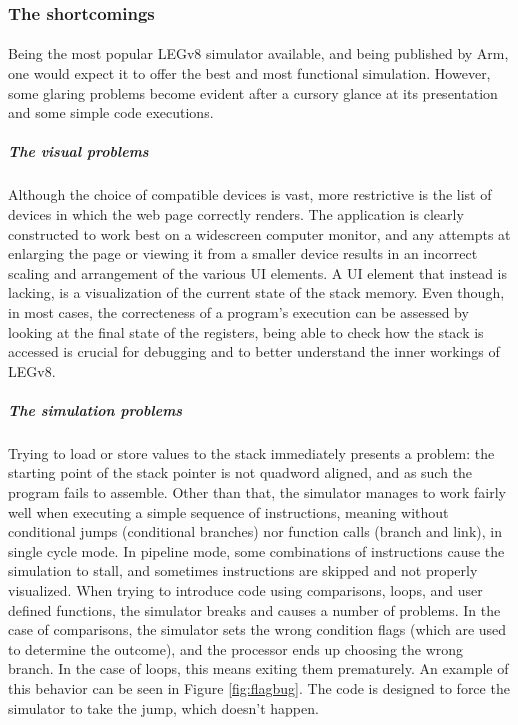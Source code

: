 \subsubsection{The shortcomings}
\paragraph{}
Being the most popular LEGv8 simulator available, and being published by Arm, one would expect it to offer the best and most functional simulation. However, some glaring problems become evident after a cursory glance at its presentation and some simple code executions.
\subparagraph{The visual problems}
Although the choice of compatible devices is vast, more restrictive is the list of devices in which the web page correctly renders. The application is clearly constructed to work best on a widescreen computer monitor, and any attempts at enlarging the page or viewing it from a smaller device results in an incorrect scaling and arrangement of the various UI elements. A UI element that instead is lacking, is a visualization of the current state of the stack memory. Even though, in most cases, the correcteness of a program's execution can be assessed by looking at the final state of the registers, being able to check how the stack is accessed is crucial for debugging and to better understand the inner workings of LEGv8.
\subparagraph{The simulation problems}
Trying to load or store values to the stack immediately presents a problem: the starting point of the stack pointer is not quadword aligned, and as such the program fails to assemble. Other than that, the simulator manages to work fairly well when executing a simple sequence of instructions, meaning without conditional jumps (conditional branches) nor function calls (branch and link), in single cycle mode. In pipeline mode, some combinations of instructions cause the simulation to stall, and sometimes instructions are skipped and not properly visualized. When trying to introduce code using comparisons, loops, and user defined functions, the simulator breaks and causes a number of problems. In the case of comparisons, the simulator sets the wrong condition flags (which are used to determine the outcome), and the processor ends up choosing the wrong branch. In the case of loops, this means exiting them prematurely. An example of this behavior can be seen in Figure \ref{fig:flagbug}. The code is designed to force the simulator to take the jump, which doesn't happen.
